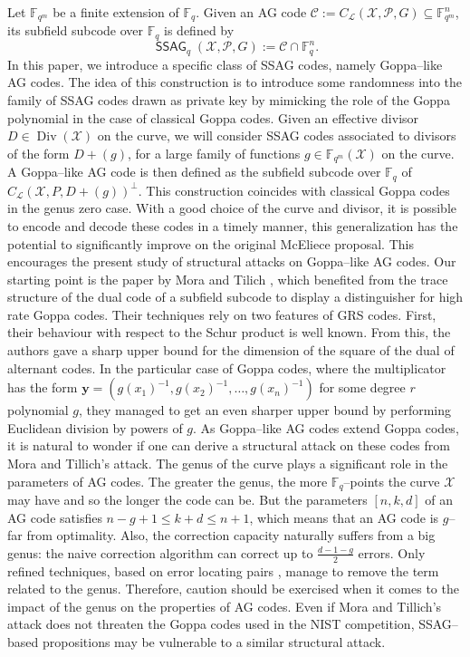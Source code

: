 \documentclass[a4paper]{article}
\theoremstyle{definition}
\theoremstyle{remark}
\newcommand{\calP}{\mathcal{P}}
\newcommand{\calL}{\mathcal{L}}
\newcommand{\calC}{\mathcal{C}}
\newcommand{\calX}{\mathcal{X}}
\newcommand{\fqm}{\mathbb{F}_{q^m}}
\newcommand{\fq}{\mathbb{F}_{q}}
\newcommand{\F}{\mathbb{F}}
\newcommand{\Div}{\operatorname{Div}}
\newcommand{\ssag}[1]{\operatorname{\mathsf{SSAG}}_{q}\left(#1\right)}
\begin{document}
Let $\fqm$ be a finite extension of $\fq$. Given an AG code $\calC :=C_{\calL}(\calX,\calP,G) \subseteq \fqm^n$, its subfield subcode over $\fq$ is defined by 
$$\ssag{\calX,\calP,G} := \calC \cap \fq^n.$$  
In this paper, we introduce a specific class of SSAG codes, namely Goppa--like AG codes. The idea of this construction is to introduce  some randomness into the family of SSAG codes drawn as private key by mimicking the role of the Goppa polynomial in the case of classical Goppa codes. Given an effective divisor $D\in \Div(\calX)$ on the curve, we will consider SSAG codes associated to divisors of the form $D+(g)$, for a large family of functions $g \in \fqm(\calX)$ on the curve. A Goppa--like AG code is then defined as the subfield subcode over $\fq$ of $C_{\calL}(\calX,P,D+(g))^{\perp}$. This construction coincides with classical Goppa codes in the genus zero case. With a good choice of the curve and divisor, it is possible to encode and decode these codes in a timely manner, this generalization has the potential to significantly improve on the original McEliece proposal. This encourages the present study of structural attacks on Goppa--like AG codes. 
Our starting point is the paper by Mora and Tilich \cite{MT21}, which benefited from the trace structure of the dual code of a subfield subcode to display a distinguisher for high rate Goppa codes. Their techniques rely on two features of GRS codes. First, their behaviour with respect to the Schur product is well known. From this, the authors gave a sharp upper bound for the dimension of the square of the dual of alternant codes. In the particular case of Goppa codes, where the multiplicator has the form $\mathbf{y}=(g(x_1)^{-1},g(x_2)^{-1},\dots,g(x_n)^{-1})$ for some degree $r$ polynomial $g$, they managed to get an even sharper upper bound by performing Euclidean division by powers of $g$.
As Goppa--like AG codes extend Goppa codes, it is natural to wonder if one can derive a structural attack on these codes from Mora and Tillich's attack. The genus of the curve plays a significant role in the parameters of AG codes. The greater the genus, the more $\F_q$--points the curve $\calX$ may have and so the longer the code can be. But the parameters $[n,k,d]$ of an AG code satisfies $n-g+1 \leq k+d \leq n+1$, which means that an AG code is $g$--far from optimality. Also, the correction capacity naturally suffers from a big genus: the naive correction algorithm can correct up to $\frac{d-1-g}{2}$ errors. Only refined techniques, based on error locating pairs \cite{CP20}, manage to remove the term related to the genus. Therefore, caution should be exercised when it comes to the impact of the genus on the properties of AG codes.
Even if Mora and Tillich's attack does not threaten the Goppa codes used in the NIST competition, SSAG--based propositions may be vulnerable to a similar structural attack. 
\end{document}
